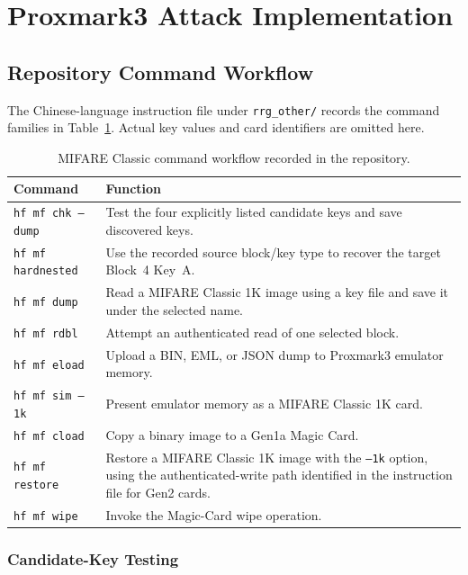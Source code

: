\documentclass[sigconf]{acmart}
\begin{document}
\section{Proxmark3 Attack Implementation}
\label{sec:attack-practice}

\subsection{Repository Command Workflow}

The Chinese-language instruction file under \texttt{rrg\_other/} records the command families in Table~\ref{tab:attack-workflow}. Actual key values and card identifiers are omitted here.

\begin{table}[H]
\centering
\caption{MIFARE Classic command workflow recorded in the repository.}
\label{tab:attack-workflow}
\small
\begin{tabular}{p{}p{}}
\toprule
\textbf{Command} & \textbf{Function} \\
\midrule
\texttt{hf mf chk --dump} & Test the four explicitly listed candidate keys and save discovered keys. \\
\texttt{hf mf hardnested} & Use the recorded source block/key type to recover the target Block~4 Key~A. \\
\texttt{hf mf dump} & Read a MIFARE Classic 1K image using a key file and save it under the selected name. \\
\texttt{hf mf rdbl} & Attempt an authenticated read of one selected block. \\
\texttt{hf mf eload} & Upload a BIN, EML, or JSON dump to Proxmark3 emulator memory. \\
\texttt{hf mf sim --1k} & Present emulator memory as a MIFARE Classic 1K card. \\
\texttt{hf mf cload} & Copy a binary image to a Gen1a Magic Card. \\
\texttt{hf mf restore} & Restore a MIFARE Classic 1K image with the \texttt{--1k} option, using the authenticated-write path identified in the instruction file for Gen2 cards. \\
\texttt{hf mf wipe} & Invoke the Magic-Card wipe operation. \\
\bottomrule
\end{tabular}
\end{table}
\subsubsection{Candidate-Key Testing}
\end{document}
